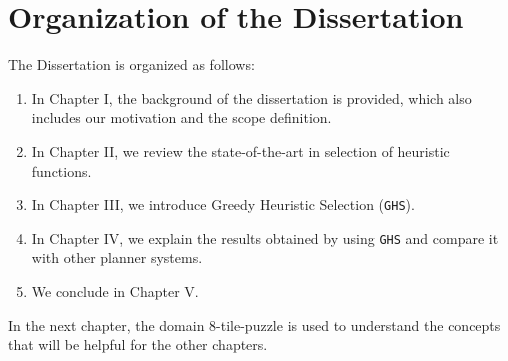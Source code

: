 \section{Organization of the Dissertation}
\noindent
The Dissertation is organized as follows: 
\begin{enumerate}
\item In Chapter I, the background of the dissertation is provided, which also includes our motivation and the scope definition.
\item In Chapter II, we review the state-of-the-art in selection of heuristic functions.
\item In Chapter III, we introduce Greedy Heuristic Selection (\texttt{GHS}). 
\item In Chapter IV, we explain the results obtained by using \texttt{GHS} and compare it with other planner systems.
\item We conclude in Chapter V.
\end{enumerate}

In the next chapter, the domain 8-tile-puzzle is used to understand the concepts that will be helpful for the other chapters. \\

\clearpage